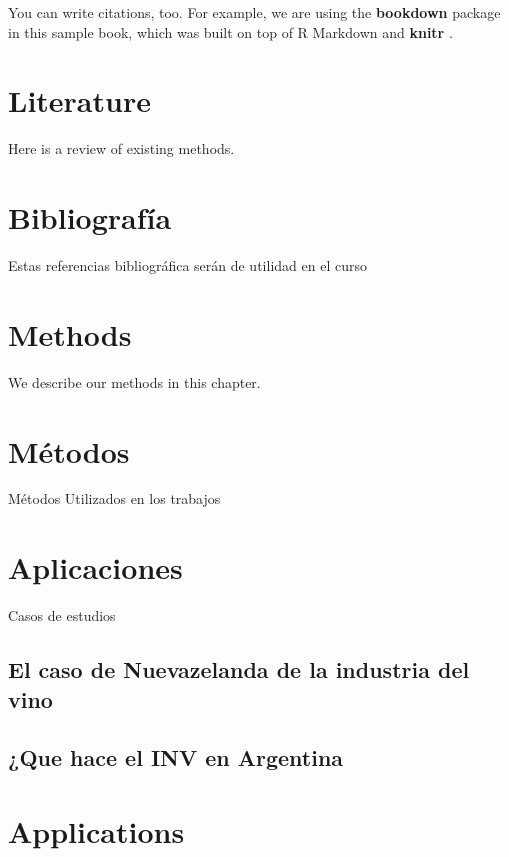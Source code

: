 \documentclass[]{article}
\begin{document}
You can write citations, too. For example, we are using the
\textbf{bookdown} package \autocite{R-bookdown} in this sample book,
which was built on top of R Markdown and \textbf{knitr}
\autocite{xie2015}.

\section{Literature}\label{literature}

Here is a review of existing methods.

\section{Bibliografía}\label{bibliografuxeda}

Estas referencias bibliográfica serán de utilidad en el curso

\section{Methods}\label{methods}

We describe our methods in this chapter.

\section{Métodos}\label{muxe9todos}

Métodos Utilizados en los trabajos

\section{Aplicaciones}\label{aplicaciones}

Casos de estudios

\subsection{El caso de Nuevazelanda de la industria del
vino}\label{el-caso-de-nuevazelanda-de-la-industria-del-vino}

\subsection{¿Que hace el INV en
Argentina}\label{que-hace-el-inv-en-argentina}

\section{Applications}\label{applications}
\end{document}
